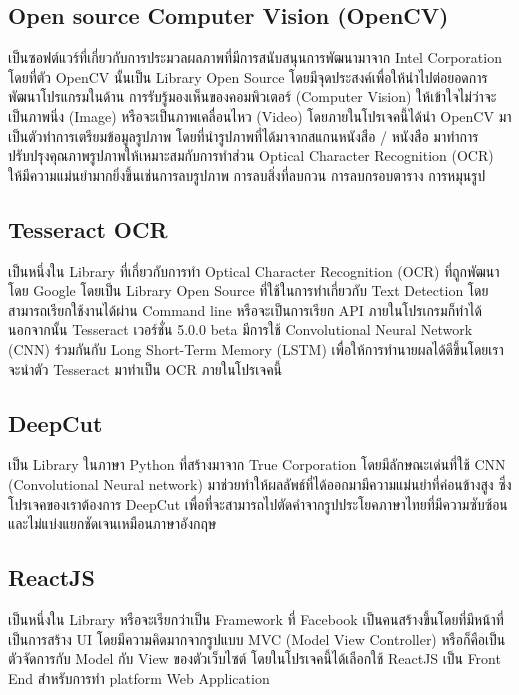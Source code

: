 \subsection{Open source Computer Vision (OpenCV)}

เป็นซอฟต์แวร์ที่เกี่ยวกับการประมวลผลภาพที่มีการสนับสนุนการพัฒนามาจาก Intel Corporation โดยที่ตัว OpenCV นั้นเป็น Library Open Source  โดยมีจุดประสงค์เพื่อให้นำไปต่อยอดการพัฒนาโปรแกรมในด้าน การรับรู้มองเห็นของคอมพิวเตอร์ (Computer Vision) ให้เข้าใจไม่ว่าจะเป็นภาพนิ่ง (Image) หรือจะเป็นภาพเคลื่อนไหว (Video) โดยภายในโปรเจคนี้ได้นำ OpenCV มาเป็นตัวทำการเตรียมข้อมูลรูปภาพ โดยที่นำรูปภาพที่ได้มาจากสแกนหนังสือ / หนังสือ มาทำการปรับปรุงคุณภาพรูปภาพให้เหมาะสมกับการทำส่วน Optical Character Recognition (OCR) ให้มีความแม่นยำมากยิ่งขึ้นเช่นการลบรูปภาพ การลบสิ่งที่ลบกวน การลบกรอบตาราง การหมุนรูป 

\subsection{Tesseract OCR}

เป็นหนึ่งใน Library ที่เกี่ยวกับการทำ Optical Character Recognition (OCR) ที่ถูกพัฒนาโดย Google โดยเป็น Library Open Source ที่ใช้ในการทำเกี่ยวกับ Text Detection โดยสามารถเรียกใช้งานได้ผ่าน Command line หรือจะเป็นการเรียก API ภายในโปรเกรมก็ทำได้นอกจากนั้น Tesseract เวอร์ชั่น 5.0.0 beta มีการใช้ Convolutional Neural Network (CNN) \cite{keiron} ร่วมกันกับ Long Short-Term Memory (LSTM) เพื่อให้การทำนายผลได้ดีขึ้นโดยเราจะนำตัว Tesseract มาทำเป็น OCR ภายในโปรเจคนี้

\subsection{DeepCut}

เป็น Library ในภาษา Python ที่สร้างมาจาก True Corporation โดยมีลักษณะเด่นที่ใช้ CNN (Convolutional Neural network) \cite{keiron} มาช่วยทำให้ผลลัพธ์ที่ได้ออกมามีความแม่นยำที่ค่อนข้างสูง  ซึ่งโปรเจคของเราต้องการ DeepCut เพื่อที่จะสามารถไปตัดคำจากรูปประโยคภาษาไทยที่มีความซับซ้อน และไม่แบ่งแยกชัดเจนเหมือนภาษาอังกฤษ 

\subsection{ReactJS}

เป็นหนึ่งใน Library หรือจะเรียกว่าเป็น Framework ที่ Facebook  เป็นคนสร้างขึ้นโดยที่มีหน้าที่เป็นการสร้าง UI โดยมีความคิดมากจากรูปแบบ MVC \cite{techterms} (Model View Controller) หรือก็คือเป็นตัวจัดการกับ Model กับ View ของตัวเว็บไซต์ โดยในโปรเจคนี้ได้เลือกใช้ ReactJS เป็น Front End สำหรับการทำ platform Web Application 

